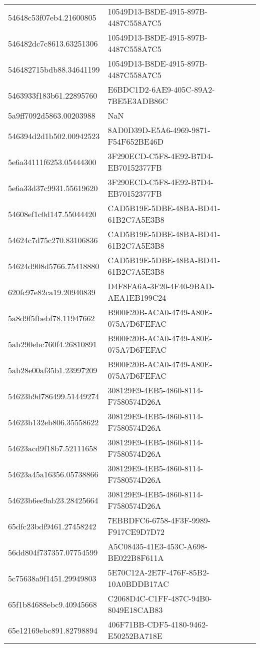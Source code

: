 \begin{tabular}{ll}
54648c53f07eb4.21600805 & 10549D13-B8DE-4915-897B-4487C558A7C5 \\
546482dc7c8613.63251306 & 10549D13-B8DE-4915-897B-4487C558A7C5 \\
546482715bdb88.34641199 & 10549D13-B8DE-4915-897B-4487C558A7C5 \\
5463933f183b61.22895760 & E6BDC1D2-6AE9-405C-89A2-7BE5E3ADB86C \\
5a9ff7092d5863.00203988 & NaN \\
546394d2d1b502.00942523 & 8AD0D39D-E5A6-4969-9871-F54F652BE46D \\
5e6a34111f6253.05444300 & 3F290ECD-C5F8-4E92-B7D4-EB70152377FB \\
5e6a33d37c9931.55619620 & 3F290ECD-C5F8-4E92-B7D4-EB70152377FB \\
54608ef1c0d147.55044420 & CAD5B19E-5DBE-48BA-BD41-61B2C7A5E3B8 \\
54624c7d75c270.83106836 & CAD5B19E-5DBE-48BA-BD41-61B2C7A5E3B8 \\
54624d908d5766.75418880 & CAD5B19E-5DBE-48BA-BD41-61B2C7A5E3B8 \\
620fc97e82ca19.20940839 & D4F8FA6A-3F20-4F40-9BAD-AEA1EB199C24 \\
5a8d9f5fbebf78.11947662 & B900E20B-ACA0-4749-A80E-075A7D6FEFAC \\
5ab290ebc760f4.26810891 & B900E20B-ACA0-4749-A80E-075A7D6FEFAC \\
5ab28e00af35b1.23997209 & B900E20B-ACA0-4749-A80E-075A7D6FEFAC \\
54623b9d786499.51449274 & 308129E9-4EB5-4860-8114-F7580574D26A \\
54623b132eb806.35558622 & 308129E9-4EB5-4860-8114-F7580574D26A \\
54623acd9f18b7.52111658 & 308129E9-4EB5-4860-8114-F7580574D26A \\
54623a45a16356.05738866 & 308129E9-4EB5-4860-8114-F7580574D26A \\
54623b6ee9ab23.28425664 & 308129E9-4EB5-4860-8114-F7580574D26A \\
65dfc23bdf9461.27458242 & 7EBBDFC6-6758-4F3F-9989-F917CE9D7D72 \\
56dd804f737357.07754599 & A5C08435-41E3-453C-A698-BE022B8F611A \\
5c75638a9f1451.29949803 & 5E70C12A-2E7F-476F-85B2-10A0BDDB17AC \\
65f1b84688ebc9.40945668 & C2068D4C-C1FF-487C-94B0-8049E18CAB83 \\
65e12169ebc891.82798894 & 406F71BB-CDF5-4180-9462-E50252BA718E \\

\end{tabular}
